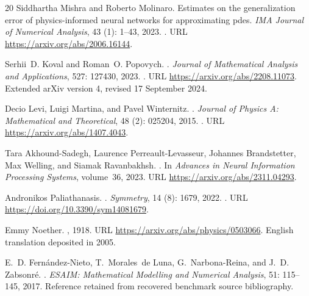 \documentclass[11pt]{article}
\theoremstyle{definition}
\begin{document}
\begin{thebibliography}{20}
Siddhartha Mishra and Roberto Molinaro.
\newblock Estimates on the generalization error of physics-informed neural
  networks for approximating pdes.
\newblock \emph{IMA Journal of Numerical Analysis}, 43 (1):
  1--43, 2023.
\newblock {}.
\newblock URL \url{https://arxiv.org/abs/2006.16144}.

Serhii~D. Koval and Roman~O. Popovych.
.
\newblock \emph{Journal of Mathematical Analysis and Applications},
  527: 127430, 2023.
\newblock {}.
\newblock URL \url{https://arxiv.org/abs/2208.11073}.
\newblock Extended arXiv version 4, revised 17 September 2024.

Decio Levi, Luigi Martina, and Pavel Winternitz.
.
\newblock \emph{Journal of Physics A: Mathematical and Theoretical},
  48 (2): 025204, 2015.
\newblock {}.
\newblock URL \url{https://arxiv.org/abs/1407.4043}.

Tara Akhound-Sadegh, Laurence Perreault-Levasseur, Johannes Brandstetter, Max
  Welling, and Siamak Ravanbakhsh.
.
\newblock In \emph{Advances in Neural Information Processing Systems},
  volume~36, 2023.
\newblock URL \url{https://arxiv.org/abs/2311.04293}.

Andronikos Paliathanasis.
.
\newblock \emph{Symmetry}, 14 (8): 1679, 2022.
\newblock {}.
\newblock URL \url{https://doi.org/10.3390/sym14081679}.

Emmy Noether.
, 1918.
\newblock URL \url{https://arxiv.org/abs/physics/0503066}.
\newblock English translation deposited in 2005.

E.~D. Fern{\'a}ndez-Nieto, T.~Morales~de Luna, G.~Narbona-Reina, and J.~D.
  Zabsonr{\'e}.
.
\newblock \emph{ESAIM: Mathematical Modelling and Numerical Analysis},
  51: 115--145, 2017.
\newblock Reference retained from recovered benchmark source bibliography.


\end{thebibliography}
\end{document}
